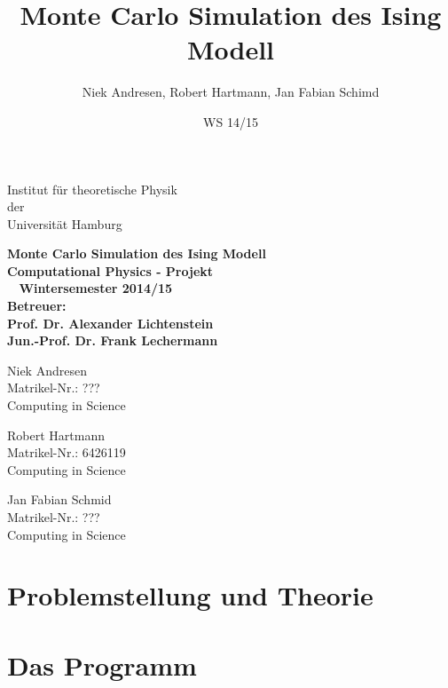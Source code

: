 \documentclass[12pt,a4paper, german]{article}
\title{Monte Carlo Simulation des Ising Modell}
\author{Niek Andresen, Robert Hartmann, Jan Fabian Schimd}
\date{WS 14/15}
\newcommand{\changefont}[3]{
\fontfamily{#1} \fontseries{#2} \fontshape{#3} \selectfont}
\begin{document}
\begin{titlepage}
   

        \begin{center}
            \changefont{cmr}{m}{sc} 
            Institut für theoretische Physik\\
            der\\
            Universität Hamburg\\
            \vspace{5cm}

            \large\bf{Monte Carlo Simulation des Ising Modell}\\
           \vspace{2cm}       
             Computational Physics - Projekt\\\
            \vspace{3cm}
            \large Wintersemester 2014/15\\
	\vspace{2cm}
	Betreuer:\\
	Prof. Dr. Alexander Lichtenstein\\
	Jun.-Prof. Dr. Frank Lechermann\\
	



        \end{center}
\vfill
	\parbox{5cm}{\footnotesize
           Niek Andresen\\
           Matrikel-Nr.: ???\\
	Computing in Science}
\hfill
	\parbox{5cm}{\footnotesize
           Robert Hartmann\\
           Matrikel-Nr.: 6426119\\
	Computing in Science}
\hfill
	\parbox{5cm}{\footnotesize
           Jan Fabian Schmid\\
           Matrikel-Nr.: ???\\
	Computing in Science}
\end{titlepage}
\maketitle

\tableofcontents
\newpage

\section{Problemstellung und Theorie}

\newpage
\section{Das Programm}

\newpage
\end{document}
